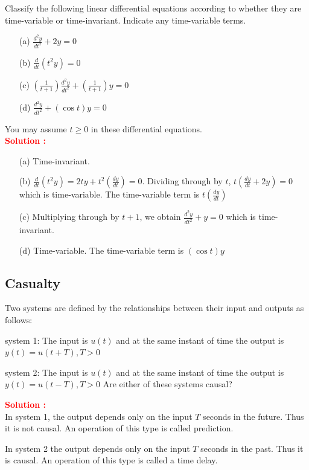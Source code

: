 \documentclass[12pt]{article}
\begin{document}
Classify the following linear differential equations according to whether they are time-variable or time-invariant. Indicate any time-variable terms.
\begin{itemize}
    \item[(a)] \(\frac{d^2y}{dt^2} + 2y = 0\)
    \item[(b)] \(\frac{d}{dt}(t^2y) = 0 \)
    \item[(c)] \( \left( \frac{1}{t+1} \right) \frac{d^2y}{dt^2} + \left( \frac{1}{t+1} \right)y = 0 \)
    \item[(d)] \(\frac{d^2y}{dt^2} + (\cos t)y = 0 \)
\end{itemize}
You may assume \(t\geq0\) in these differential equations.\\
\textbf{\textcolor{red}{Solution :}}
\begin{itemize}
    \item[(a)] Time-invariant.
    \item[(b)] \(\frac{d}{dt}(t^2y) = 2ty + t^2 \left( \frac{dy}{dt} \right) = 0 \). Dividing through by \(t\), \(t\left(\frac{dy}{dt} + 2y \right) = 0\) which is time-variable. The time-variable term is \(t\left( \frac{dy}{dt} \right)\)
    \item[(c)] Multiplying through by \(t+1\), we obtain \(\frac{d^2y}{dt^2} + y = 0\) which is time-invariant.
    \item[(d)] Time-variable. The time-variable term is \((\cos t) y\)
\end{itemize}

\clearpage
\subsection{Casualty}

Two systems are defined by the relationships between their input and outputs as follows:

system 1: The input is \(u(t)\) and at the same instant of time the output is \(y(t) = u(t+T), T>0\)

system 2: The input is \(u(t)\) and at the same instant of time the output is \(y(t) = u(t-T), T>0\)
Are either of these systems causal?

\textbf{\textcolor{red}{Solution :}} \\
In system 1, the output depends only on the input \(T\) seconds in the future. Thus it is not causal. An operation of this type is called prediction.

In system 2 the output depends only on the input \(T\) seconds in the past. Thus it is causal. An operation of this type is called a time delay.
\end{document}
